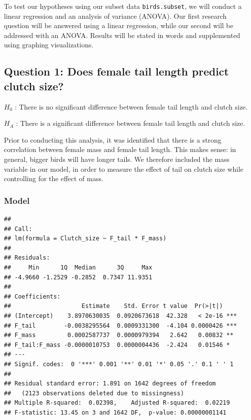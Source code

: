 \documentclass[
  12pt,
]{article}
\begin{document}
To test our hypotheses using our subset data \texttt{birds.subset}, we
will conduct a linear regression and an analysis of variance (ANOVA).
Our first research question will be answered using a linear regression,
while our second will be addressed with an ANOVA. Results will be stated
in words and supplemented using graphing visualizations.

\hypertarget{question-1-does-female-tail-length-predict-clutch-size}{%
\subsection{Question 1: Does female tail length predict clutch
size?}\label{question-1-does-female-tail-length-predict-clutch-size}}

\(H_0\) : There is no significant difference between female tail length
and clutch size.

\(H_A\) : There is a significant difference between female tail length
and clutch size.

Prior to conducting this analysis, it was identified that there is a
strong correlation between female mass and female tail length. This
makes sense: in general, bigger birds will have longer tails. We
therefore included the mass variable in our model, in order to measure
the effect of tail on clutch size while controlling for the effect of
mass.

\hypertarget{model}{%
\subsubsection{Model}\label{model}}

\begin{verbatim}
## 
## Call:
## lm(formula = Clutch_size ~ F_tail * F_mass)
## 
## Residuals:
##     Min      1Q  Median      3Q     Max 
## -4.9660 -1.2529 -0.2852  0.7347 11.9351 
## 
## Coefficients:
##                    Estimate    Std. Error t value  Pr(>|t|)    
## (Intercept)    3.8970630035  0.0920673618  42.328   < 2e-16 ***
## F_tail        -0.0038295564  0.0009331300  -4.104 0.0000426 ***
## F_mass         0.0002587737  0.0000979394   2.642   0.00832 ** 
## F_tail:F_mass -0.0000010753  0.0000004436  -2.424   0.01546 *  
## ---
## Signif. codes:  0 '***' 0.001 '**' 0.01 '*' 0.05 '.' 0.1 ' ' 1
## 
## Residual standard error: 1.891 on 1642 degrees of freedom
##   (2123 observations deleted due to missingness)
## Multiple R-squared:  0.02398,    Adjusted R-squared:  0.02219 
## F-statistic: 13.45 on 3 and 1642 DF,  p-value: 0.00000001141
\end{verbatim}
\end{document}
